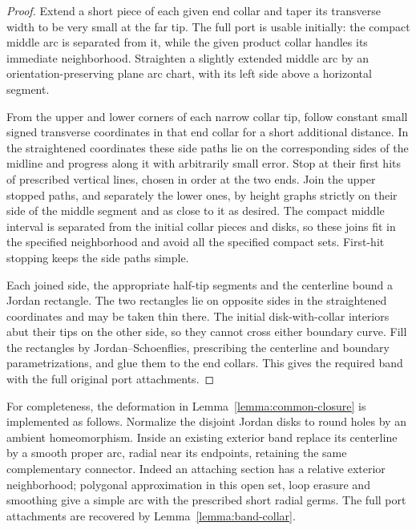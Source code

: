 \begin{proof}
Extend a short piece of each given end collar and taper its transverse
width to be very small at the far tip.  The full port is usable initially:
the compact middle arc is separated from it, while the given product
collar handles its immediate neighborhood.  Straighten a slightly
extended middle arc by an orientation-preserving plane arc chart, with
its left side above a horizontal segment.

From the upper and lower corners of each narrow collar tip, follow
constant small signed transverse coordinates in that end collar for a
short additional distance.  In the straightened coordinates these side
paths lie on the corresponding sides of the midline and progress along
it with arbitrarily small error.  Stop at their first hits of prescribed
vertical lines, chosen in order at the two ends.  Join the upper stopped
paths, and separately the lower ones, by height graphs strictly on their
side of the middle segment and as close to it as desired.  The compact
middle interval is separated from the initial collar pieces and disks,
so these joins fit in the specified neighborhood and avoid all the
specified compact sets.  First-hit stopping keeps the side paths simple.

Each joined side, the appropriate half-tip segments and the centerline
bound a Jordan rectangle.  The two rectangles lie on opposite sides in
the straightened coordinates and may be taken thin there.  The initial
disk-with-collar interiors abut their tips on the other side, so they
cannot cross either boundary curve.  Fill the rectangles by
Jordan--Schoenflies, prescribing the centerline and boundary
parametrizations, and glue them to the end collars.  This gives the
required band with the full original port attachments.
\end{proof}

For completeness, the deformation in
Lemma~\ref{lemma:common-closure} is implemented as follows.  Normalize
the disjoint Jordan disks to round holes by an ambient homeomorphism.
Inside an existing exterior band replace its centerline by a smooth
proper arc, radial near its endpoints, retaining the same complementary
connector.  Indeed an attaching section has a relative exterior
neighborhood; polygonal approximation in this open set, loop erasure
and smoothing give a simple arc with the prescribed short radial germs.
The full port attachments are recovered by
Lemma~\ref{lemma:band-collar}.

